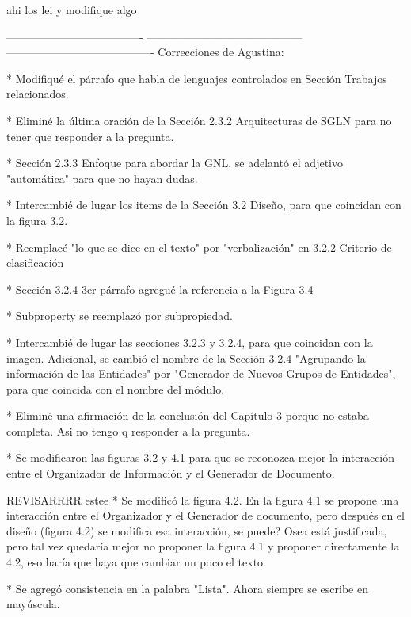 
ahi los lei y modifique algo


-------------------------------------
------------------------------------------
----------------------------------------
Correcciones de Agustina:

* Modifiqué el párrafo que habla de lenguajes controlados en Sección Trabajos relacionados.

* Eliminé la última oración de la Sección 2.3.2 Arquitecturas de SGLN para no tener que responder a la pregunta.

* Sección 2.3.3 Enfoque para abordar la GNL, se adelantó el adjetivo "automática" para que no hayan dudas.

* Intercambié de lugar los items de la Sección 3.2 Diseño, para que coincidan con la figura 3.2.

* Reemplacé "lo que se dice en el texto" por "verbalización" en 3.2.2 Criterio de clasificación

* Sección 3.2.4 3er párrafo agregué la referencia a la Figura 3.4 

* Subproperty se reemplazó por subpropiedad.

* Intercambié de lugar las secciones 3.2.3 y 3.2.4, para que coincidan con la imagen. Adicional, se cambió el nombre de la Sección 3.2.4 "Agrupando la información de las Entidades" por "Generador de Nuevos Grupos de Entidades", para que coincida con el nombre del módulo.

* Eliminé una afirmación de la conclusión del Capítulo 3 porque no estaba completa. Asi no tengo q responder a la pregunta.

* Se modificaron las figuras 3.2 y 4.1 para que se reconozca mejor la interacción entre el Organizador de Información y el Generador de Documento.

REVISARRRR estee
* Se modificó la figura 4.2. En la figura 4.1 se propone una interacción entre el Organizador y el Generador de documento, pero después en el diseño (figura 4.2) se modifica esa interacción, se puede? Osea está justificada, pero tal vez quedaría mejor no proponer la figura 4.1 y proponer directamente la 4.2, eso haría que haya que cambiar un poco el texto.

* Se agregó consistencia en la palabra "Lista". Ahora siempre se escribe en mayúscula.

